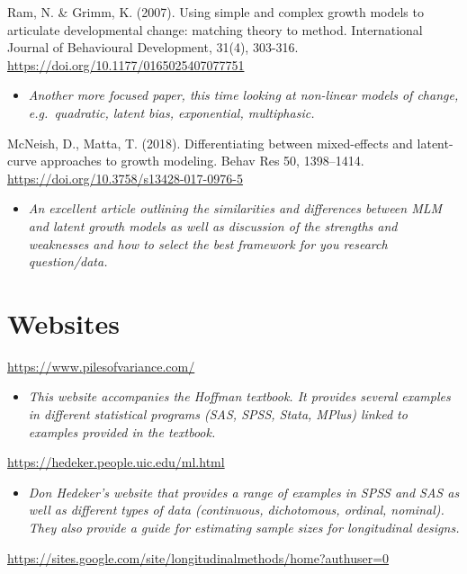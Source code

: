 \documentclass[
]{book}
\providecommand{\tightlist}{%
  \setlength{\itemsep}{0pt}\setlength{\parskip}{0pt}}
\begin{document}
Ram, N. \& Grimm, K. (2007). Using simple and complex growth models to articulate developmental change: matching theory to method. International Journal of Behavioural Development, 31(4), 303-316. \url{https://doi.org/10.1177/0165025407077751}

\begin{itemize}
\tightlist
\item
  \emph{Another more focused paper, this time looking at non-linear models of change, e.g.~quadratic, latent bias, exponential, multiphasic. }
\end{itemize}

McNeish, D., Matta, T. (2018). Differentiating between mixed-effects and latent-curve approaches to growth modeling. Behav Res 50, 1398--1414. \url{https://doi.org/10.3758/s13428-017-0976-5}

\begin{itemize}
\tightlist
\item
  \emph{An excellent article outlining the similarities and differences between MLM and latent growth models as well as discussion of the strengths and weaknesses and how to select the best framework for you research question/data. }
\end{itemize}

\hypertarget{websites-2}{%
\section{Websites}\label{websites-2}}

\url{https://www.pilesofvariance.com/}

\begin{itemize}
\tightlist
\item
  \emph{This website accompanies the Hoffman textbook. It provides several examples in different statistical programs (SAS, SPSS, Stata, MPlus) linked to examples provided in the textbook. }
\end{itemize}

\url{https://hedeker.people.uic.edu/ml.html}

\begin{itemize}
\tightlist
\item
  \emph{Don Hedeker's website that provides a range of examples in SPSS and SAS as well as different types of data (continuous, dichotomous, ordinal, nominal). They also provide a guide for estimating sample sizes for longitudinal designs. }
\end{itemize}

\url{https://sites.google.com/site/longitudinalmethods/home?authuser=0}
\end{document}

